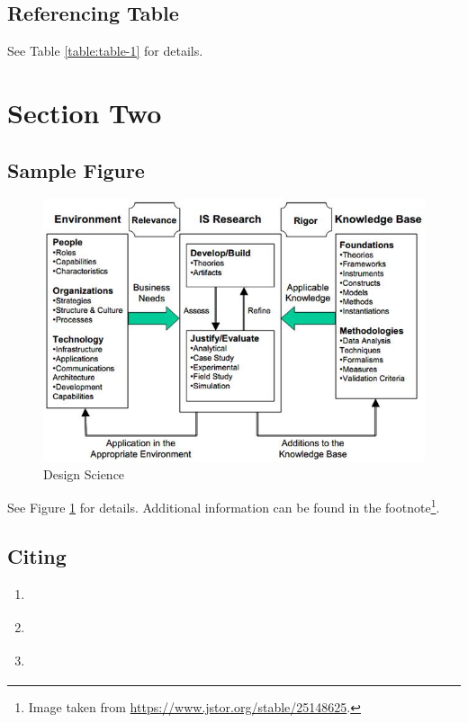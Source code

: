 \documentclass[a4paper]{article}
\begin{document}
\subsection{Referencing Table}
See Table \ref{table:table-1} for details.

\clearpage
\section{Section Two}
\subsection{Sample Figure}
\begin{figure}[htbp]
\centering
\includegraphics[width=.9\linewidth]{./figures/hevner.png}
\caption{Design Science}
\label{figure:hevner}
\end{figure}
See Figure \ref{figure:hevner} for details. Additional information can be
found in the footnote\footnote{Image taken from \url{https://www.jstor.org/stable/25148625}.}.
\subsection{Citing}

\begin{enumerate}
\item \parencite{hevner04_desig_scien_infor_system_resear}
\item \parencite{hevner04_desig_scien_infor_system_resear}
\item \textcite{hevner04_desig_scien_infor_system_resear}
\end{enumerate}



\clearpage
\printbibliography
\end{document}
